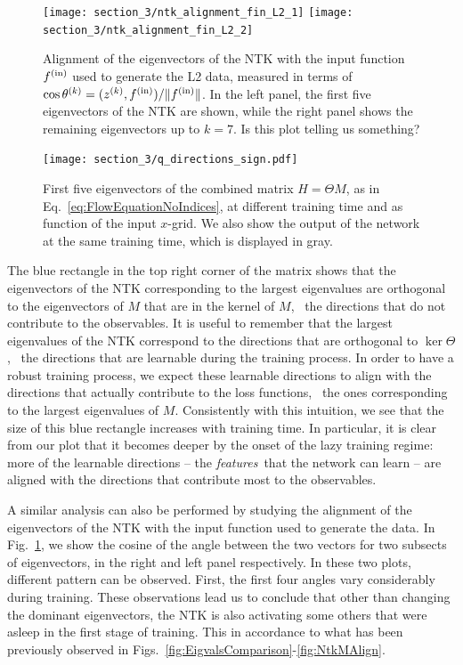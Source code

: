 \begin{figure}[ht!]
  \centering
  \texttt{[image: section\_3/ntk\_alignment\_fin\_L2\_1]}
  \texttt{[image: section\_3/ntk\_alignment\_fin\_L2\_2]}
  \caption{Alignment of the eigenvectors of the NTK with the input function
  $f^{\rm(in)}$ used to generate the L2 data, measured in terms of $\cos
  \theta^{(k)} = (z^{(k)}, f^{\rm{(in)}})/ \Vert f^{\rm{(in)}}\Vert$. In the
  left panel, the first five eigenvectors of the NTK are shown, while the right
  panel shows the remaining eigenvectors up to $k=7$. \ac{Is this plot telling
  us something?}}
  \label{fig:NTKAlignFin}
\end{figure}
\begin{figure}[ht!]
  \centering
  \texttt{[image: section\_3/q\_directions\_sign.pdf]}
  \caption{First five eigenvectors of the combined matrix $H=\Theta M$, as in
  Eq.~\eqref{eq:FlowEquationNoIndices}, at different training time and as
  function of the input $x$-grid. We also show the output of the network at the
  same training time, which is displayed in gray.}
  \label{fig:NTKMEigVecs}
\end{figure}

The blue rectangle in the top right corner of the matrix shows that the
eigenvectors of the NTK corresponding to the largest eigenvalues are orthogonal
to the eigenvectors of $M$ that are in the kernel of $M$, \ie\ the directions
that do not contribute to the observables. It is useful to remember that the
largest eigenvalues of the NTK correspond to the directions that are orthogonal
to $\ker\Theta$, \ie\ the directions that are learnable during the training
process. In order to have a robust training process, we expect these learnable
directions to align with the directions that actually contribute to the loss
functions, \ie\ the ones corresponding to the largest eigenvalues of $M$.
Consistently with this intuition, we see that the size of this blue rectangle
increases with training time. In particular, it is clear from our plot that it
becomes deeper by the onset of the lazy training regime: more of the learnable
directions -- the {\it features}\ that the network can learn -- are aligned with
the directions that contribute most to the observables.

A similar analysis can also be performed by studying the alignment of the
eigenvectors of the NTK with the input function used to generate the data. In
Fig.~\ref{fig:NTKAlignFin}, we show the cosine of the angle between the two
vectors for two subsects of eigenvectors, in the right and left panel
respectively. In these two plots, different pattern can be observed. First, the
first four angles vary considerably during training. These observations lead us
to conclude that other than changing the dominant eigenvectors, the NTK is also
activating some others that were asleep in the first stage of training. This in
accordance to what has been previously observed in
Figs.~\ref{fig:EigvalsComparison}-\ref{fig:NtkMAlign}. 

